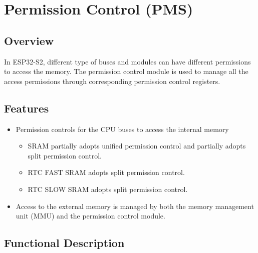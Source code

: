 \documentclass[main\_\_EN.tex]{subfiles}
\begin{document}
\setenglishformatting

\ifglobal
\else
    \listoftodos
    {\let\clearpage\relax \listofdonetodos}
    \tableofcontents
\fi




\hypertarget{permctrl}{}
\chapter{Permission Control (PMS)}
\label{mod:permctrl}


\section{Overview}
In ESP32-S2, different type of buses and modules can have different permissions to access the memory. The permission control module is used to manage all the access permissions through corresponding permission control registers.

\section{Features}

\begin{itemize}
    \item Permission controls for the CPU buses to access the internal memory
    \begin{itemize}
        \item SRAM partially adopts unified permission control and partially adopts split permission control.
        \item RTC FAST SRAM adopts split permission control.
        \item RTC SLOW SRAM adopts split permission control.
    \end{itemize}
    \item Access to the external memory is managed by both the memory management unit (MMU) and the permission control module.
\end{itemize}

\section{Functional Description}
\end{document}
